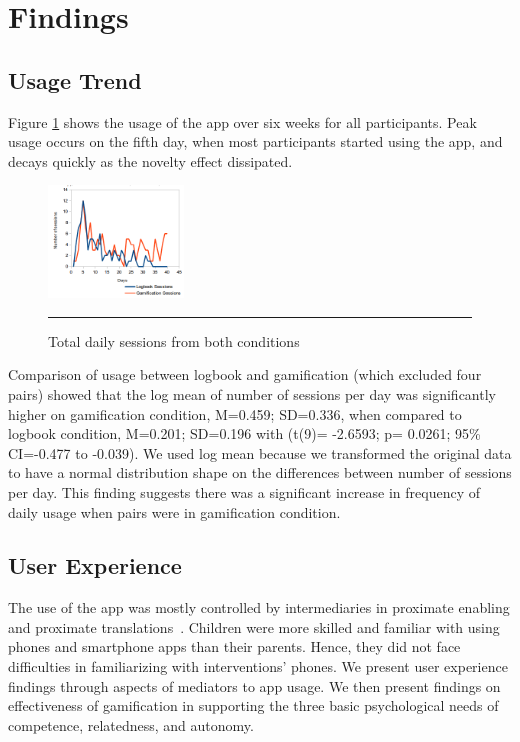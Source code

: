 \documentclass{sig-alternate}
\begin{document}
\section{Findings}
\subsection{Usage Trend} 
Figure \ref{figure:usagedailysessions} shows the usage of the app over six weeks for all participants. Peak usage occurs on the fifth day, when most participants started using the app, and decays quickly as the novelty effect dissipated. 
\begin{figure}[htbp]
  \centering
    \includegraphics[width=0.32\textwidth]{scatter_daily_sessions.png}
    \rule{26em}{0.5pt}
  \caption{Total daily sessions from both conditions}
  \label{figure:usagedailysessions}
\end{figure} 
Comparison of usage between logbook and gamification (which excluded four pairs) showed that the log mean of number of sessions per day was significantly higher on gamification condition, M=0.459; SD=0.336, when compared to logbook condition, M=0.201; SD=0.196 with (t(9)= -2.6593; p= 0.0261; 95\% CI=-0.477 to -0.039). We used log mean because we transformed the original data to have a normal distribution shape on the differences between number of sessions per day. This finding suggests there was a significant increase in frequency of daily usage when pairs were in gamification condition.

\subsection{User Experience}
The use of the app was mostly controlled by intermediaries in proximate enabling and proximate translations~\cite{sambasivan2010}. Children were more skilled and familiar with using phones and smartphone apps than their parents. Hence, they did not face difficulties in familiarizing with interventions' phones. We present user experience findings through aspects of  mediators to app usage. We then present findings on effectiveness of gamification in supporting the three basic psychological needs of competence, relatedness, and autonomy.
\end{document}
